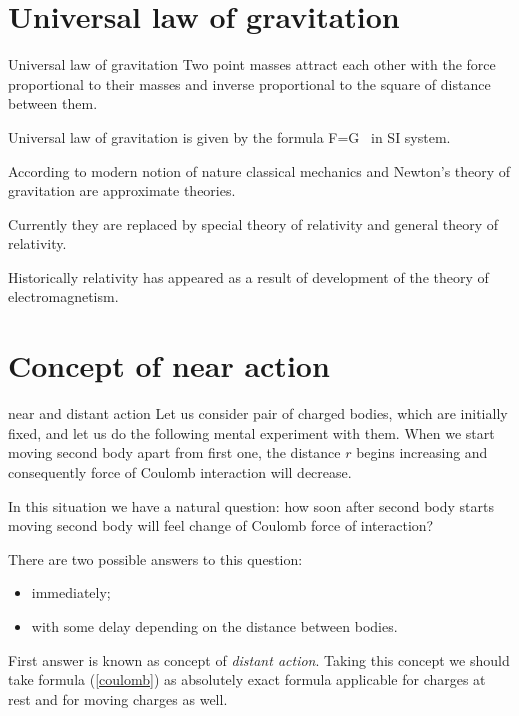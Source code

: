 \documentclass[10pt]{beamer}
\begin{document}
\section{Universal law of gravitation} 
\begin{frame}[fragile]{Universal law of gravitation}
\alert{Two point masses
attract each other with the force proportional to their masses and
inverse proportional to the square of distance between them}.

Universal law of gravitation is given by the  formula
\be
F=G \,  
\ee
in  SI system.
   
    According to modern notion of nature \alert{classical mechanics and
Newton's theory of gravitation are approximate theories}. 

Currently
they are replaced by \alert{special theory of relativity and general
theory of relativity}. 

Historically relativity has  appeared as a result of
development of the theory of electromagnetism. 

\end{frame}

\section{ Concept of near action}
\begin{frame}[fragile]{near and distant action}
     Let us consider pair of charged bodies, which are initially
fixed, and let us do the following mental experiment with them.
When we start moving second body apart from first one, the distance
$r$ begins increasing and consequently force of Coulomb interaction
 will decrease. 
 
 In this situation we have a natural
question: how soon after second body starts moving second body
will feel change of Coulomb force of interaction? 

There are two
possible answers to this question:
\begin{itemize}
\item immediately;
\item with some delay depending on the distance between bodies.
\end{itemize}
    
    \alert{First answer is known as concept of {\it distant action}}.
Taking this concept we should take formula (\ref{coulomb}) as
absolutely exact formula applicable for charges at rest and for
moving charges as well.

\end{frame}
\end{document}
